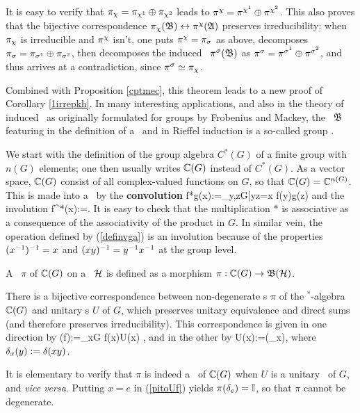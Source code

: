 It is easy to verify that $\pi_{\chi}=\pi_{\chi^1}\oplus \pi_{\chi^2}$ leads
to $\pi^{\chi}=\pi^{\chi^1}\oplus \pi^{\chi^2}$. This also proves that the
bijective correspondence $\pi_{\chi}({\frak B})\leftrightarrow\pi^{\chi}({\frak A})$ preserves
irreducibility: when $\pi_{\chi}$ is irreducible and $\pi^{\chi}$ isn't, one puts
$\pi^{\chi}=\pi_{\sigma}$ as above, decomposes $\pi_{\sigma}= \pi_{\sigma^1}\oplus
\pi_{\sigma^2}$, then decomposes the induced \rep\ $\pi^{\sigma}({\frak B})$ as
$\pi^{\sigma}=\pi^{\sigma^1}\oplus \pi^{\sigma^2}$, and thus arrives at a
contradiction, since $\pi^{\sigma}\simeq \pi_{\chi}$.  \enp
 
Combined with Proposition \ref{cptmec}, this theorem leads to a new
proof of Corollary \ref{1irrepkh}.
In many interesting applications, and also in the theory of induced
\rep\ as originally formulated for groups by Frobenius and Mackey, the
\ca\ ${\frak B}$ featuring in the definition of a \HCM\ and in Rieffel induction
is a so-called group \ca. 

We start with the definition of the group algebra $C^*(G)$ of a finite group
with $n(G)$ elements;
one then usually writes ${\Bbb C}(G)$ instead of $C^*(G)$.
As a vector space, ${\Bbb C}(G)$ consist of all complex-valued functions on $G$,
so that ${\Bbb C}(G)={\Bbb C}^{n(G)}$. 
This is made into a \sta\ by the {\bf convolution}
\be
f*g(x):=\sum_{y,z\in G|yz=x} f(y)g(z) 
\ee
and the involution
\be
f^*(x):=. 
\ee
It is easy to check that the multiplication $*$ is associative as a consequence
of the associativity of the product in $G$. In similar vein, the operation
defined by (\ref{definvga}) is an involution because of the properties
$(x^{-1})^{-1}=x$ and $(xy)^{-1}=y^{-1} x^{-1}$ at the group level.

 A \rep\ $\pi$ of ${\Bbb C}(G)$  on a \Hs\
${\cal H}$ is defined  as a morphism $\pi:{\Bbb C}(G)\rightarrow {\frak B}({\cal H})$. 
\begin{Proposition}
There is a bijective correspondence between non-degene\-ra\-te \rep s
$\pi$ of the $\mbox{}^*$-algebra ${\Bbb C}(G)$ 
 and unitary \rep s $U$ of $G$, which preserves unitary equivalence and
direct sums (and therefore preserves irreducibility).  This
correspondence is given in one direction by 
\be
\pi(f):=\sum_{x\in G} f(x)U(x) , 
\ee 
and in the other by
\be
U(x):=\pi(\dl_x), 
\ee
where $\delta_x(y):=\delta(xy)$.
\end{Proposition}

It is elementary to verify that $\pi$ is indeed a \rep\ of ${\Bbb C}(G)$ when
$U$ is a unitary \rep\ of $G$, and {\em vice versa}.
Putting $x=e$ in (\ref{pitoUf}) yields $\pi(\delta_e)={\Bbb I}$, so that $\pi$ 
cannot be degenerate. 

